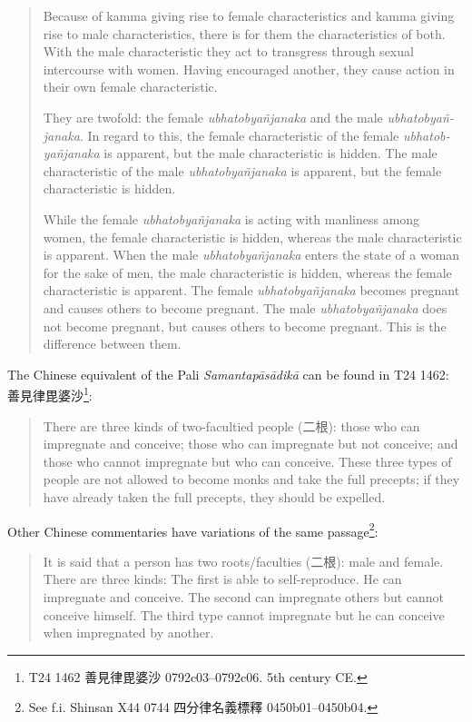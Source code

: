 \begin{quote}
Because of kamma giving rise to female characteristics and kamma giving rise to male characteristics, there is for them the characteristics of both. With the male characteristic they act to transgress through sexual intercourse with women. Having encouraged another, they cause action in their own female characteristic. 

They are twofold: the female {\em ubhatob­yañ­janaka} and the male {\em ubhatob­yañ­janaka}. In regard to this, the female characteristic of the female {\em ubhatob­yañ­janaka} is apparent, but the male characteristic is hidden. The male characteristic of the male {\em ubhatob­yañ­janaka} is apparent, but the female characteristic is hidden. 

While the female {\em ubhatob­yañ­janaka} is acting with manliness among women, the female characteristic is hidden, whereas the male characteristic is apparent. 
When the male {\em ubhatob­yañ­janaka} enters the state of a woman for the sake of men, the male characteristic is hidden, whereas the female characteristic is apparent. 
The female {\em ubhatob­yañ­janaka} becomes pregnant and causes others to become pregnant. The male {\em ubhatob­yañ­janaka} does not become pregnant, but causes others to become pregnant. This is the difference between them.
\end{quote}

The Chinese equivalent of the Pali {\em Samantapāsādikā} can be found in T24 1462: 善見律毘婆沙\footnote{T24 1462 善見律毘婆沙 0792c03–0792c06. 5th century CE.}:
\begin{quote}
There are three kinds of two-facultied people (二根): those who can impregnate and conceive; those who can impregnate but not conceive; and those who cannot impregnate but who can conceive. These three types of people are not allowed to become monks and take the full precepts; if they have already taken the full precepts, they should be expelled.
\end{quote}

Other Chinese commentaries have variations of the same passage\footnote{See f.i. Shinsan X44 0744 四分律名義標釋 0450b01–0450b04.}:
\begin{quote}
It is said that a person has two roots/faculties (二根): male and female. There are three kinds: The first is able to self-reproduce. He can impregnate and conceive. The second can impregnate others but cannot conceive himself. The third type cannot impregnate but he can conceive when impregnated by another. 
\end{quote}

